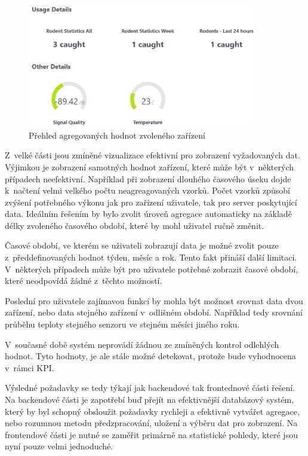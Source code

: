 \begin{figure}[H]
\label{l4-other}
\begin{center}
    \includegraphics[width=0.9\textwidth]{obrazky-figures/l4-other.png}
\end{center}
\caption{Přehled agregovaných hodnot zvoleného zařízení}
\end{figure}

Z~velké části jsou zmíněné vizualizace efektivní pro zobrazení vyžadovaných dat. Výjimkou je zobrazení samotných hodnot zařízení, které může být v~některých případech neefektivní. Například při zobrazení dlouhého časového úseku dojde k~načtení velmi velkého počtu neagreagovaných vzorků. Počet vzorků způsobí zvýšení potřebného výkonu jak pro zařízení uživatele, tak pro server poskytující data. Ideálním řešením by bylo zvolit úroveň agregace automaticky na základě délky zvoleného časového období, které by mohl uživatel ručně změnit.

Časové období, ve kterém se uživateli zobrazují data je možné zvolit pouze z~předdefinovaných hodnot týden, měsíc a rok. Tento fakt přináší další limitaci. V~některých případech může být pro uživatele potřebné zobrazit časové období, které neodpovídá žádné z~těchto možností. 

Poslední pro uživatele zajímavou funkcí by mohla být možnost srovnat data dvou zařízení, nebo data stejného zařízení v~odlišném období. Například tedy srovnání průběhu teploty stejného senzoru ve stejném měsíci jiného roku.

V~současné době systém neprovádí žádnou ze zmíněných kontrol odlehlých hodnot. Tyto hodnoty, je ale stále možné detekovat, protože bude vyhodnocena v~rámci KPI.

Výsledné požadavky se tedy týkají jak backendové tak frontednové části řešení. Na backendové části je zapotřebí buď přejít na efektivnější databázový systém, který by byl schopný obsloužit požadavky rychleji a efektivně vytvářet agregace, nebo rozumnou metodu předzpracování, uložení a výběru dat pro zobrazení. Na frontendové části je nutné se zaměřit primárně na statistické pohledy, které jsou nyní pouze velmi jednoduché.

